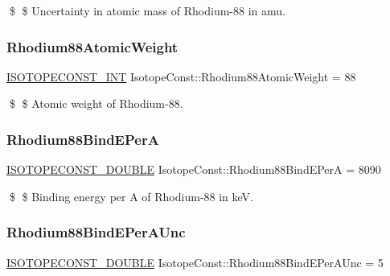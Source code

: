 \$ \$ Uncertainty in atomic mass of Rhodium-\/88 in amu. \mbox{\label{group___isotope_const-_rhodium-_rh88_ga8d2079a18a9f69544eea12263a699b06}} 
\subsubsection{\texorpdfstring{Rhodium88\+Atomic\+Weight}{Rhodium88AtomicWeight}}
{\footnotesize\ttfamily \mbox{\hyperlink{group___isotope_const-_macros_ga5f18360b3e99483a35c32d789e62621c}{I\+S\+O\+T\+O\+P\+E\+C\+O\+N\+S\+T\+\_\+\+I\+NT}} Isotope\+Const\+::\+Rhodium88\+Atomic\+Weight = 88}

\$ \$ Atomic weight of Rhodium-\/88. \mbox{\label{group___isotope_const-_rhodium-_rh88_ga0ca43e928cfa3669b82c18964d29c164}} 
\subsubsection{\texorpdfstring{Rhodium88\+Bind\+E\+PerA}{Rhodium88BindEPerA}}
{\footnotesize\ttfamily \mbox{\hyperlink{group___isotope_const-_macros_ga8f45a7272ce02c0b4c65c44636ed719a}{I\+S\+O\+T\+O\+P\+E\+C\+O\+N\+S\+T\+\_\+\+D\+O\+U\+B\+LE}} Isotope\+Const\+::\+Rhodium88\+Bind\+E\+PerA = 8090}

\$ \$ Binding energy per A of Rhodium-\/88 in keV. \mbox{\label{group___isotope_const-_rhodium-_rh88_ga7347790397344711847ea69722602827}} 
\subsubsection{\texorpdfstring{Rhodium88\+Bind\+E\+Per\+A\+Unc}{Rhodium88BindEPerAUnc}}
{\footnotesize\ttfamily \mbox{\hyperlink{group___isotope_const-_macros_ga8f45a7272ce02c0b4c65c44636ed719a}{I\+S\+O\+T\+O\+P\+E\+C\+O\+N\+S\+T\+\_\+\+D\+O\+U\+B\+LE}} Isotope\+Const\+::\+Rhodium88\+Bind\+E\+Per\+A\+Unc = 5}

